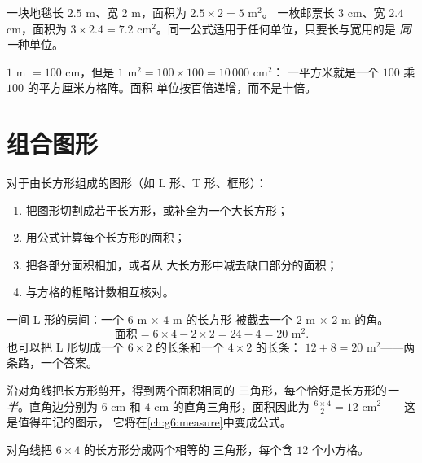 \begin{example}\label{ex:g5:areas:rectangle}
一块地毯长 $2.5$ m、宽 $2$ m，面积为 $2.5 \times 2 = 5$ m$^2$。
一枚邮票长 $3$ cm、宽 $2.4$ cm，面积为 $3 \times 2.4 = 7.2$
cm$^2$。同一公式适用于任何单位，只要长与宽用的是
\emph{同一}种单位。
\end{example}

\begin{example}[平方单位按 100 换算]\label{ex:g5:areas:units}
$1$ m $= 100$ cm，但是 $1$ m$^2 = 100 \times 100 = 10\,000$ cm$^2$：
一平方米就是一个 $100$ 乘 $100$ 的平方厘米方格阵。面积
单位按百倍递增，而不是十倍。
\end{example}

\section{组合图形}

\begin{method}[切割、相加、相减]\label{met:g5:areas:composite}
对于由长方形组成的图形（如 L 形、T 形、框形）：
\begin{enumerate}
  \item 把图形切割成若干长方形，或补全为一个大长方形；
  \item 用公式计算每个长方形的面积；
  \item 把各部分面积相加，或者从
        大长方形中减去缺口部分的面积；
  \item 与方格的粗略计数相互核对。
\end{enumerate}
\end{method}

\begin{example}\label{ex:g5:areas:composite}
一间 L 形的房间：一个 $6$ m $\times$ $4$ m 的长方形
被截去一个 $2$ m $\times$ $2$ m 的角。
\[
\text{面积} = 6 \times 4 - 2 \times 2 = 24 - 4 = 20 \text{ m}^2 .
\]
也可以把 L 形切成一个 $6 \times 2$ 的长条和一个 $4 \times 2$ 的长条：
$12 + 8 = 20$ m$^2$——两条路，一个答案。
\end{example}

\begin{example}[长方形的一半]\label{ex:g5:areas:halfrect}
沿对角线把长方形剪开，得到两个面积相同的
三角形，每个恰好是长方形的\emph{一半}。直角边分别为
$6$ cm 和 $4$ cm 的直角三角形，面积因此为 $\frac{6 \times 4}{2} = 12$
cm$^2$——这是值得牢记的图示，
它将在\cref{ch:g6:measure}中变成公式。
\end{example}

\begin{omfigure}

{\small 对角线把 $6 \times 4$ 的长方形分成两个相等的
三角形，每个含 $12$ 个小方格。}
\end{omfigure}


